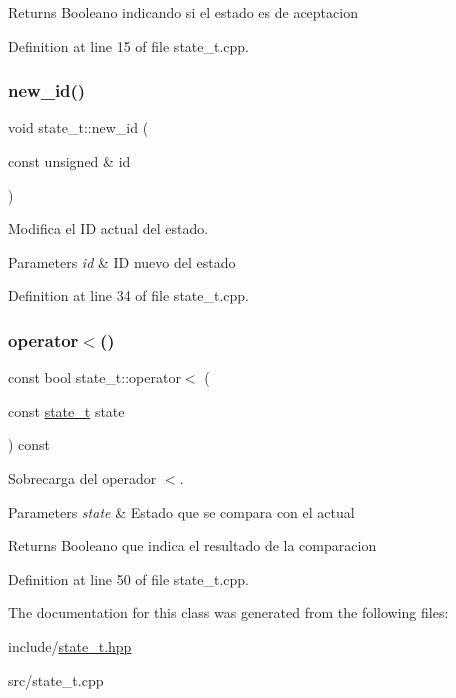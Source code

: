 \begin{DoxyReturn}{Returns}
Booleano indicando si el estado es de aceptacion 
\end{DoxyReturn}


Definition at line 15 of file state\+\_\+t.\+cpp.

\mbox{\label{classstate__t_a541e80fbf886c337d53c0e5614f0c38b}} 
\subsubsection{\texorpdfstring{new\+\_\+id()}{new\_id()}}
{\footnotesize\ttfamily void state\+\_\+t\+::new\+\_\+id (\begin{DoxyParamCaption}\item[{const unsigned \&}]{id }\end{DoxyParamCaption})}



Modifica el ID actual del estado. 


\begin{DoxyParams}{Parameters}
{\em id} & ID nuevo del estado \\
\hline
\end{DoxyParams}


Definition at line 34 of file state\+\_\+t.\+cpp.

\mbox{\label{classstate__t_aef60c051e68f523c809033f2e9bdd202}} 
\subsubsection{\texorpdfstring{operator$<$()}{operator<()}}
{\footnotesize\ttfamily const bool state\+\_\+t\+::operator$<$ (\begin{DoxyParamCaption}\item[{const \hyperlink{classstate__t}{state\+\_\+t}}]{state }\end{DoxyParamCaption}) const}



Sobrecarga del operador \textquotesingle{}$<$\textquotesingle{}. 


\begin{DoxyParams}{Parameters}
{\em state} & Estado que se compara con el actual \\
\hline
\end{DoxyParams}
\begin{DoxyReturn}{Returns}
Booleano que indica el resultado de la comparacion 
\end{DoxyReturn}


Definition at line 50 of file state\+\_\+t.\+cpp.



The documentation for this class was generated from the following files\+:\begin{DoxyCompactItemize}
\item 
include/\hyperlink{state__t_8hpp}{state\+\_\+t.\+hpp}\item 
src/state\+\_\+t.\+cpp\end{DoxyCompactItemize}
